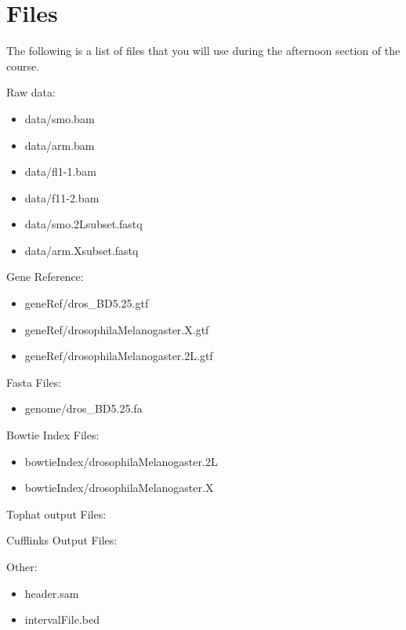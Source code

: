 \documentclass[a4paper,11pt,english]{sphinxmanual}
\begin{document}
\chapter{Files}
\label{exercises/file:files}\label{exercises/file::doc}
The following is a list of files that you will use during the afternoon section of the course.

Raw data:
\begin{itemize}
\item {} 
data/smo.bam

\item {} 
data/arm.bam

\item {} 
data/fl1-1.bam

\item {} 
data/f11-2.bam

\item {} 
data/smo.2Lsubset.fastq

\item {} 
data/arm.Xsubset.fastq

\end{itemize}

Gene Reference:
\begin{itemize}
\item {} 
geneRef/dros\_BD5.25.gtf

\item {} 
geneRef/drosophilaMelanogaster.X.gtf

\item {} 
geneRef/drosophilaMelanogaster.2L.gtf

\end{itemize}

Fasta Files:
\begin{itemize}
\item {} 
genome/dros\_BD5.25.fa

\end{itemize}

Bowtie Index Files:
\begin{itemize}
\item {} 
bowtieIndex/drosophilaMelanogaster.2L

\item {} 
bowtieIndex/drosophilaMelanogaster.X

\end{itemize}

Tophat output Files:

Cufflinks Output Files:

Other:
\begin{itemize}
\item {} 
header.sam

\item {} 
intervalFile.bed

\end{itemize}
\end{document}

